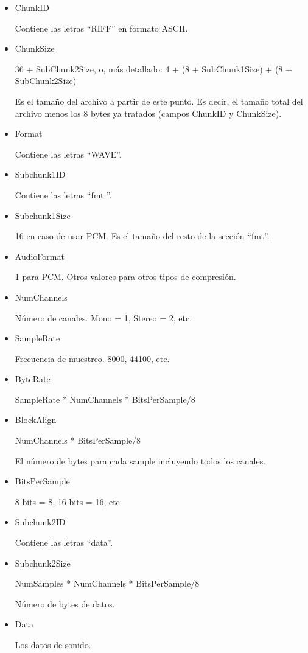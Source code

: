 \documentclass[12pt]{article}
\begin{document}
\begin{itemize}

\item ChunkID          

Contiene las letras ``RIFF'' en formato ASCII.

\item ChunkSize

36 + SubChunk2Size, o, más detallado:
4 + (8 + SubChunk1Size) + (8 + SubChunk2Size)
                               
Es el tamaño del archivo a partir de este punto. Es decir, el tamaño total del archivo menos los 8 bytes ya tratados (campos ChunkID y ChunkSize).

\item Format

Contiene las letras ``WAVE''.

\item Subchunk1ID

Contiene las letras ``fmt ''.

\item Subchunk1Size

16 en caso de usar PCM. Es el tamaño del resto de la sección ``fmt''.

\item AudioFormat

1 para PCM. Otros valores para otros tipos de compresión.

\item NumChannels

Número de canales. Mono = 1, Stereo = 2, etc.

\item SampleRate

Frecuencia de muestreo. 8000, 44100, etc.

\item ByteRate

SampleRate * NumChannels * BitsPerSample/8

\item BlockAlign

NumChannels * BitsPerSample/8
                               
El número de bytes para cada sample incluyendo todos los canales.

\item BitsPerSample

8 bits = 8, 16 bits = 16, etc.

\item Subchunk2ID

Contiene las letras ``data''.

\item Subchunk2Size

NumSamples * NumChannels * BitsPerSample/8
                               
Número de bytes de datos.

\item Data

Los datos de sonido.

\end{itemize}
\end{document}
